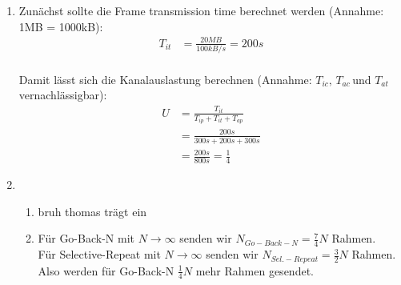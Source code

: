 \documentclass[12pt]{scrartcl}
\begin{document}
\setcounter{exnum}{3}
    \begin{enumerate}[label=(\alph*)]
        \item   Zunächst sollte die Frame transmission time berechnet werden (Annahme: 1MB = 1000kB): 
        \begin{align*}
            T_{it} &= \frac{20 MB}{100 kB/s} = 200 s
        \end{align*}\\
        Damit lässt sich die Kanalauslastung berechnen (Annahme: $T_{ic}, \, T_{ac}\, $und $ T_{at}$ vernachlässigbar):\\
        \begin{align*}
            U &= \frac{T_{it}}{T_{ip} + T_{it} + T_{ap}}\\
            &= \frac{200 s}{300 s + 200 s + 300s}\\
            &= \frac{200s}{800s} = \frac{1}{4}
        \end{align*}
        \item   \begin{enumerate}[label=(\roman*)]
            \item bruh thomas trägt ein
            \item Für Go-Back-N mit $N\rightarrow \infty$ senden wir $N_{Go-Back-N} = \frac{7}{4} N$ Rahmen.\\
                Für Selective-Repeat mit $N\rightarrow \infty$ senden wir $N_{Sel.-Repeat} = \frac{3}{2} N$ Rahmen.\\
                Also werden für Go-Back-N $\frac{1}{4} N$ mehr Rahmen gesendet.
        \end{enumerate}
    \end{enumerate}

\end{document}
